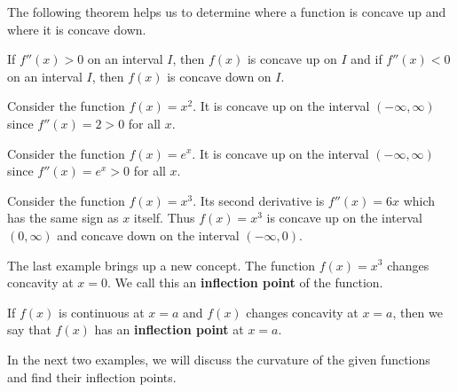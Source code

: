 \documentclass[handout]{ximera}
\begin{document}

The following theorem helps us to determine where a function is concave up and where it is concave down.\\

\begin{theorem}[Concavity]
If $f''(x) > 0$ on an interval $I$, then $f(x)$ is concave up on $I$ and
if $f''(x) < 0$ on an interval $I$, then $f(x)$ is concave down on $I$.
\end{theorem}



\begin{example}[example 1]
Consider the function $f(x) = x^2$.  It is concave up on the interval $(-\infty, \infty)$ since $f''(x) = 2 > 0$
for all $x$.
\end{example}

\begin{example}[example 2]
Consider the function $f(x) = e^x$.  It is concave up on the interval $(-\infty, \infty)$ since $f''(x) = e^x > 0$
for all $x$.
\end{example}


\begin{example}[example 3]
Consider the function $f(x) = x^3$.  Its second derivative is $f''(x) = 6x$ 
which has the same sign as $x$ itself. Thus $f(x) = x^3$ is concave up on the interval $(0, \infty)$
and concave down on the interval $(-\infty, 0)$.
\end{example}



The last example brings up a new concept.  The function $f(x) = x^3$ changes concavity at $x = 0$.  
We call this an {\bf inflection point} of the function.\\

\begin{definition}
If $f(x)$ is continuous at $x=a$ and $f(x)$ changes concavity at $x = a$, then
we say that $f(x)$ has an \textbf{inflection point} at $x = a$.
\end{definition} 

In the next two examples, we will discuss the curvature of the given functions and find their inflection points.


\begin{image}
\end{image}
\end{document}
